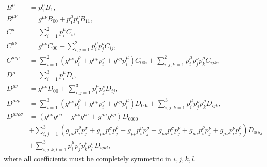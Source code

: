 \documentclass[../main.tex]{subfiles}
\begin{document}
\begin{subequations}
    \begin{align}
        B^\mu                & = p_1^\mu B_1,                                                                                                                                                                                                         \\
        B^{\mu\nu}           & = g^{\mu\nu} B_{00} + p_1^\mu p_1^\nu B_{11},                                                                                                                                                                          \\
        C^\mu                & = \sum_{i=1}^2 p_i^\mu C_i,                                                                                                                                                                                            \\
        C^{\mu\nu}           & = g^{\mu\nu} C_{00} + \sum_{i,j=1}^{2} p_i^\mu p_j^\nu C_{ij},                                                                                                                                                         \\
        C^{\mu\nu\rho}       & = \sum_{i=1}^2 (g^{\mu\nu} p_i^{\rho} + g^{\mu\rho} p_i^{\nu} + g^{\nu\rho} p_i^{\mu}) C_{00i} + \sum_{i,j,k=1}^2 p_i^\mu p_j^\nu p_k^\rho C_{ijk},                                                                    \\
        D^\mu                & = \sum_{i=1}^3 p_i^\mu D_i,                                                                                                                                                                                            \\
        D^{\mu\nu}           & = g^{\mu\nu} D_{00} + \sum_{i,j=1}^{3} p_i^\mu p_j^\nu D_{ij},                                                                                                                                                         \\
        D^{\mu\nu\rho}       & = \sum_{i=1}^3 (g^{\mu\nu} p_i^{\rho} + g^{\mu\rho} p_i^{\nu} + g^{\nu\rho} p_i^{\mu}) D_{00i} + \sum_{i,j,k=1}^3 p_i^\mu p_j^\nu p_k^\rho D_{ijk},                                                                    \\
        \nonumber
        D^{\mu\nu\rho\sigma} & = (g^{\mu\nu}g^{\rho\sigma} + g^{\mu\rho}g^{\nu\sigma} + g^{\mu\sigma}g^{\nu\rho})D_{0000}                                                                                                                             \\
        \nonumber
                             & + \sum_{i,j=1}^3 (g_{\mu\nu}p_i^\rho p_j^\sigma + g_{\mu\nu}p_i^\sigma p_j^\rho + g_{\mu\rho}p_i^\nu p_j^\sigma + g_{\mu\rho}p_i^\sigma p_j^\nu + g_{\mu\sigma}p_i^\rho p_j^\nu + g_{\mu\nu}p_i^\nu p_j^\rho) D_{00ij} \\
                             & + \sum_{i,j,k,l=1}^3 p_i^\mu p_j^\nu p_k^\rho p_l^\sigma D_{ijkl},
    \end{align}
\end{subequations}
where all coefficients must be completely symmetric in \(i,j,k,l\).
\end{document}
